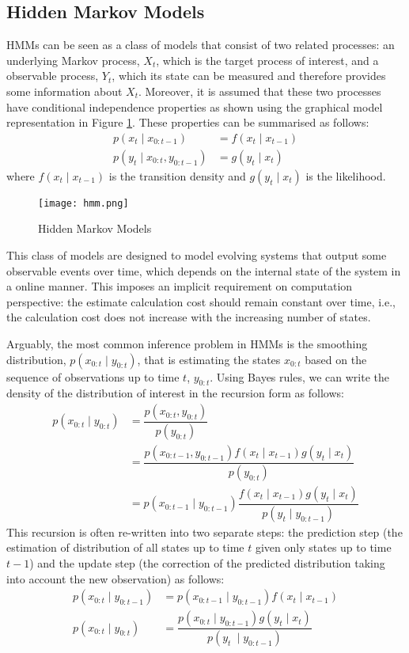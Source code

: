 \subsection{Hidden Markov Models}
HMMs can be seen as a class of models that consist of two related processes: an underlying Markov process, $X_t$, which is the target process of interest, and a observable process, $Y_t$, which its state can be measured and therefore provides some information about $X_t$. Moreover, it is assumed that these two processes have conditional independence properties as shown using the graphical model representation in Figure \ref{fig:HMM}. These properties can be summarised as follows:
\begin{align}
   p(x_t \mid x_{0:t-1}) &= f(x_t \mid x_{t-1})   \nonumber \\
   p(y_t \mid x_{0:t}, y_{0:t-1}) &= g(y_t \mid x_{t}) 
\end{align}
where $f(x_t \mid x_{t-1})$ is the transition density and $g(y_t \mid x_t)$ is the likelihood. 
\begin{figure}
\centering
\texttt{[image: hmm.png]} 
\caption{Hidden Markov Models}
\label{fig:HMM}
\end{figure}

This class of models are designed to model evolving systems that output some observable events over time, which depends on the internal state of the system in a online manner. This imposes an implicit requirement on computation perspective: the estimate calculation cost should remain constant over time, i.e., the calculation cost does not increase with the increasing number of states.

Arguably, the most common inference problem in HMMs is the smoothing distribution, $p(x_{0:t} \mid y_{0:t})$, that is estimating the states $x_{0:t}$ based on the sequence of observations up to time $t$, $y_{0:t}$. Using Bayes rules, we can write the density of the distribution of interest in the recursion form as follows:
\begin{align}
    p(x_{0:t} \mid y_{0:t}) &= \dfrac{p(x_{0:t}, y_{0:t})}{p(y_{0:t})} \nonumber \\
                            &= \dfrac{p(x_{0:t-1}, y_{0:t-1})f(x_t \mid x_{t-1}) g(y_t \mid x_t)}{p(y_{0:t})} \nonumber \\ 
                            &= p(x_{0:t-1} \mid y_{0:t-1})\dfrac{f(x_t \mid x_{t-1}) g(y_t \mid x_t)}{p(y_t \mid y_{0:t-1})} 
\end{align}
This recursion is often re-written into two separate steps: the prediction step (the estimation of distribution of all states up to time $t$ given only states up to time $t-1$) and the update step (the correction of the predicted distribution taking into account the new observation) as follows:
\begin{align}
  p(x_{0:t} \mid y_{0:t-1}) &= p(x_{0:t-1} \mid y_{0:t-1})f(x_t \mid x_{t-1}) \nonumber \\
  p(x_{0:t} \mid y_{0:t})   &= \dfrac{p(x_{0:t} \mid y_{0:t-1}) g(y_t \mid x_t)}{p(y_t\
 \mid y_{0:t-1})}
\end{align}

